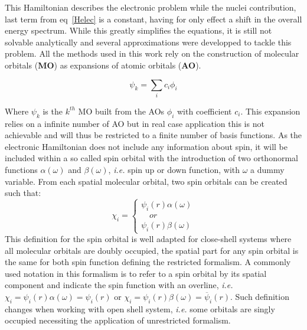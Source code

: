 \documentclass[12pt,a4paper]{report}
\numberwithin{equation}{section}
\begin{document}
This Hamiltonian describes the electronic problem while the nuclei contribution, last term from eq~\ref{Helec} is a constant, having for only effect a shift in the overall energy spectrum. 
While this greatly simplifies the equations, it is still not solvable analytically and several approximations were developped to tackle this problem. %
All the methods used in this work rely on the construction of molecular orbitals (\textbf{MO}) as expansions of atomic orbitals (\textbf{AO}).

\begin{equation}
    \psi_k=\sum_{i}c_i \phi_i
\end{equation}

Where $\psi_k$ is the $k^{th}$ MO built from the AOs $\phi_i$ with coefficient $c_i$. 
This expansion relies on a infinite number of AO but in real case application this is not achievable and will thus be restricted to a finite number of basis functions.
As the electronic Hamiltonian does not include any information about spin, it will be included within a so called spin orbital with the introduction of two orthonormal functions $\alpha(\omega)$ and $\beta(\omega)$, \textit{i.e.} spin up or down function, with $\omega$ a dummy variable.
From each spatial molecular orbital, two spin orbitals can be created such that:
\begin{equation}
    \chi_i=\begin{cases}
    \psi_i(r)\alpha(\omega)\\
    \quad or \\
    \psi_i(r)\beta(\omega)
    \end{cases}
\end{equation}
This definition for the spin orbital is well adapted for close-shell systems where all molecular orbitals are doubly occupied, the spatial part for any spin orbital is the same for both spin function defining the restricted formalism.
A commonly used notation in this formalism is to refer to a spin orbital by its spatial component and indicate the spin function with an overline, \textit{i.e.} $\chi_i=\psi_i(r)\alpha(\omega)=\psi_i(r)$ or $\chi_i=\psi_i(r)\beta(\omega)=\overline{\psi}_i(r)$.
Such definition changes when working with open shell system, \textit{i.e.} some orbitals are singly occupied necessiting the application of unrestricted formalism.
\end{document}

